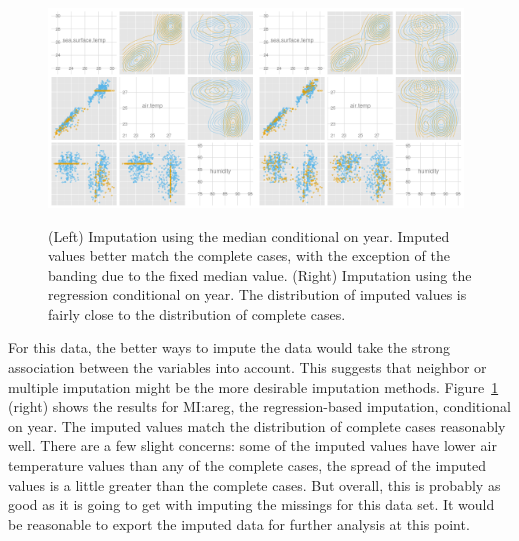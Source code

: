 \documentclass[article]{jss}
\begin{document}
\begin{figure}[htp]
\centerline{\includegraphics[width=0.49\textwidth]{graph/fig4-2-median-condition}\includegraphics[width=0.49\textwidth]{graph/fig4-4-areg-condition}}
\caption{(Left) Imputation using the median conditional on year. Imputed values better match the complete cases, with the exception of the banding due to the fixed median value. (Right) Imputation using the regression conditional on year. The distribution of imputed values is fairly close to the distribution of complete cases.}
\label{fig:tao3}
\end{figure}

For this data, the better ways to impute the data would take the strong association between the variables into account. This suggests that neighbor or multiple imputation might be the more desirable imputation methods. Figure~\ref{fig:tao3} (right) shows the results for MI:areg, the regression-based imputation, conditional on year. The imputed values match the distribution of complete cases reasonably well. There are a few slight concerns: some of the imputed values have lower air temperature values than any of the complete cases, the spread of the imputed values is a little greater than the complete cases. But overall, this is probably as good as it is going to get with imputing the missings for this data set. It would be reasonable to export the imputed data for further analysis at this point.
\end{document}

